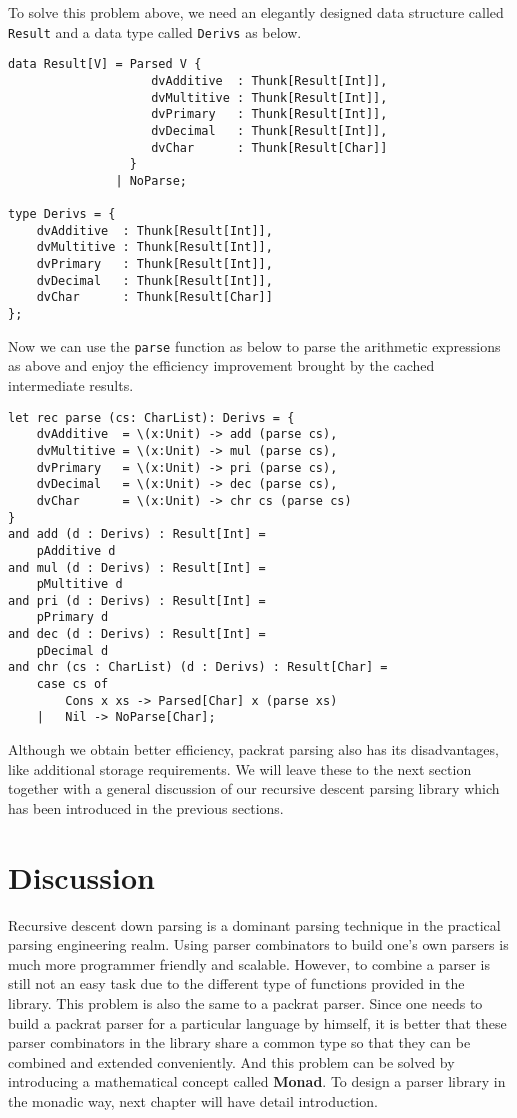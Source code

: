 To solve this problem above, we need an elegantly designed data structure called \texttt{Result} and a data type called \texttt{Derivs} as below.
\begin{lstlisting}
data Result[V] = Parsed V {
                    dvAdditive  : Thunk[Result[Int]],
                    dvMultitive : Thunk[Result[Int]],
                    dvPrimary   : Thunk[Result[Int]],
                    dvDecimal   : Thunk[Result[Int]],
                    dvChar      : Thunk[Result[Char]]
                 }
               | NoParse;

type Derivs = {
    dvAdditive  : Thunk[Result[Int]],
    dvMultitive : Thunk[Result[Int]],
    dvPrimary   : Thunk[Result[Int]],
    dvDecimal   : Thunk[Result[Int]],
    dvChar      : Thunk[Result[Char]]
};
\end{lstlisting}
Now we can use the \texttt{parse} function as below to parse the arithmetic expressions as above and enjoy the efficiency improvement brought by the cached intermediate results.
\begin{lstlisting}
let rec parse (cs: CharList): Derivs = {
    dvAdditive  = \(x:Unit) -> add (parse cs),
    dvMultitive = \(x:Unit) -> mul (parse cs),
    dvPrimary   = \(x:Unit) -> pri (parse cs),
    dvDecimal   = \(x:Unit) -> dec (parse cs),
    dvChar      = \(x:Unit) -> chr cs (parse cs)
}
and add (d : Derivs) : Result[Int] =
    pAdditive d
and mul (d : Derivs) : Result[Int] =
    pMultitive d
and pri (d : Derivs) : Result[Int] =
    pPrimary d
and dec (d : Derivs) : Result[Int] =
    pDecimal d
and chr (cs : CharList) (d : Derivs) : Result[Char] =
    case cs of 
        Cons x xs -> Parsed[Char] x (parse xs)
    |   Nil -> NoParse[Char];
\end{lstlisting}
Although we obtain better efficiency, packrat parsing also has its disadvantages, like additional storage requirements. We will leave these to the next section together with a general discussion of our recursive descent parsing library which has been introduced in the previous sections.

\section{Discussion}
Recursive descent down parsing is a dominant parsing technique in the practical parsing engineering realm. Using parser combinators to build one's own parsers is much more programmer friendly and scalable. However, to combine a parser is still not an easy task due to the different type of functions provided in the library. This problem is also the same to a packrat parser. Since one needs to build a packrat parser for a particular language by himself, it is better that these parser combinators in the library share a common type so that they can be combined and extended conveniently. And this problem can be solved by introducing a mathematical concept called \textbf{Monad}. To design a parser library in the monadic way, next chapter will have detail introduction. 